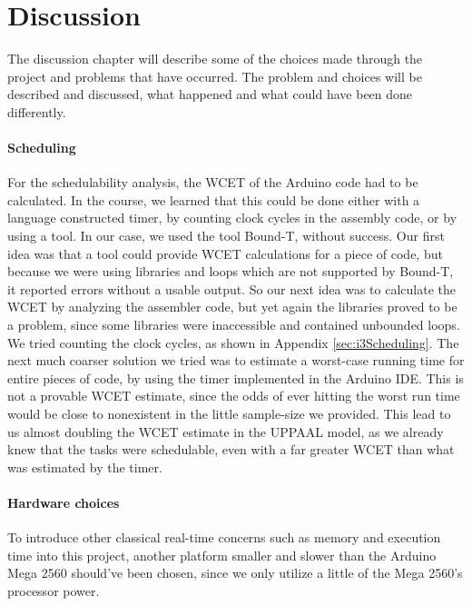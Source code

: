 \chapter{Discussion}
\label{chap:Discussion}
The discussion chapter will describe some of the choices made through the project and problems that have occurred. The problem and choices will be described and discussed, what happened and what could have been done differently. 


\subsubsection{Scheduling}
For the schedulability analysis, the WCET of the Arduino code had to be calculated. In the course, we learned that this could be done either with a language constructed timer, by counting clock cycles in the assembly code, or by using a tool. In our case, we used the tool Bound-T, without success. Our first idea was that a tool could provide WCET calculations for a piece of code, but because we were using libraries and loops which are not supported by Bound-T, it reported errors without a usable output. So our next idea was to calculate the WCET by analyzing the assembler code, but yet again the libraries proved to be a problem, since some libraries were inaccessible and contained unbounded loops. We tried counting the clock cycles, as shown in Appendix \ref{sec:i3Scheduling}. The next much coarser solution we tried was to estimate a worst-case running time for entire pieces of code, by using the timer implemented in the Arduino IDE. This is not a provable WCET estimate, since the odds of ever hitting the worst run time would be close to nonexistent in the little sample-size we provided. This lead to us almost doubling the WCET estimate in the UPPAAL model, as we already knew that the tasks were schedulable, even with a far greater WCET than what was estimated by the timer.


\subsubsection{Hardware choices}
To introduce other classical real-time concerns such as memory and execution time into this project, another platform smaller and slower than the Arduino Mega 2560 should’ve been chosen, since we only utilize a little of the Mega 2560’s processor power. 

